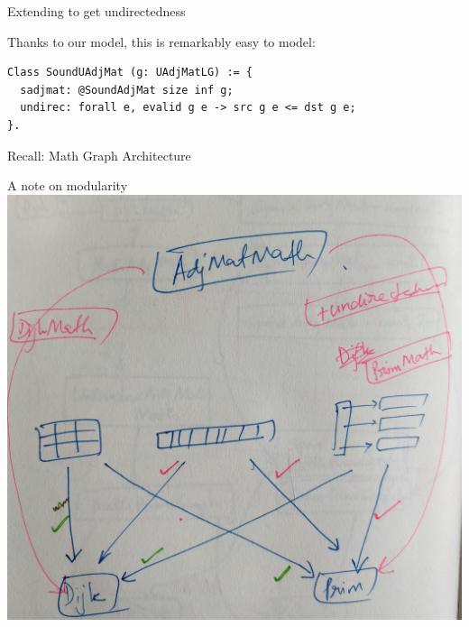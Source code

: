 \documentclass[usenames, xcolor=dvipsnames]{beamer}
\begin{document}
\begin{frame}[fragile]{Extending to get undirectedness}

Thanks to our model, this is remarkably easy to model:
\begin{Verbatim}
Class SoundUAdjMat (g: UAdjMatLG) := {
  sadjmat: @SoundAdjMat size inf g;
  undirec: forall e, evalid g e -> src g e <= dst g e;
}.
\end{Verbatim}
\end{frame}

\begin{frame}{Recall: Math Graph Architecture}
  \centering
  \colorbox{lightg}{}
\end{frame}

\begin{frame}{A note on modularity}
\centering
  \includegraphics[scale=0.07]{modularity}
\end{frame}
\end{document}
